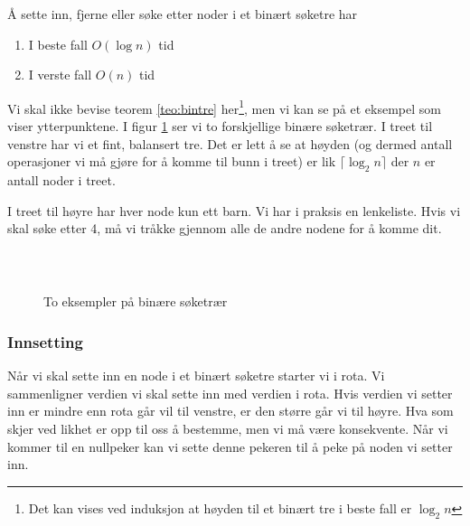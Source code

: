 \begin{theorem}
\label{teo:bintre}
Å sette inn, fjerne eller søke etter noder i et binært søketre har
\begin{enumerate}[i]
\item I beste fall $ O(\log n) $ tid
\item I verste fall $ O(n) $ tid
\end{enumerate}
\end{theorem}

Vi skal ikke bevise teorem \ref{teo:bintre} her\footnote{Det kan vises ved induksjon at høyden til et binært tre i beste fall er $ \log_2 n $}, men vi kan se på et eksempel som viser ytterpunktene. I figur \ref{fig:bintre} ser vi to forskjellige binære søketrær. I treet til venstre har vi et fint, balansert tre. Det er lett å se at høyden (og dermed antall operasjoner vi må gjøre for å komme til bunn i treet) er lik $ \lceil \log_2 n \rceil $ der $ n $ er antall noder i treet.

I treet til høyre har hver node kun ett barn. Vi har i praksis en lenkeliste. Hvis vi skal søke etter 4, må vi tråkke gjennom alle de andre nodene for å komme dit. 

\begin{figure}[H]
\caption{To eksempler på binære søketrær}
\label{fig:bintre}
\centering
~\\
$ \quad\quad $
\end{figure}




\subsubsection{Innsetting}
Når vi skal sette inn en node i et binært søketre starter vi i rota. Vi sammenligner verdien vi skal sette inn med verdien i rota. Hvis verdien vi setter inn er mindre enn rota går vil til venstre, er den større går vi til høyre. Hva som skjer ved likhet er opp til oss å bestemme, men vi må være konsekvente. Når vi kommer til en nullpeker kan vi sette denne pekeren til å peke på noden vi setter inn.


